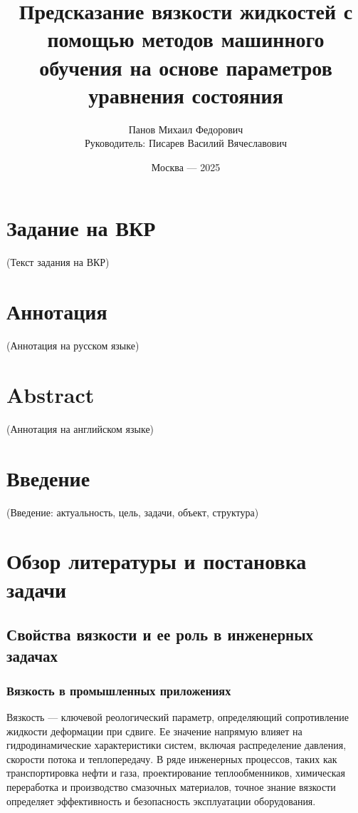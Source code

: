 \documentclass[a4paper,12pt]{article}
\title{\Huge{Предсказание вязкости жидкостей с помощью методов машинного обучения на основе параметров уравнения состояния}}
\author{Панов Михаил Федорович \\ Руководитель: Писарев Василий Вячеславович}
\date{Москва --- 2025}
\begin{document}
\maketitle
\thispagestyle{empty}
\newpage

\section*{Задание на ВКР}
(Текст задания на ВКР)

\section*{Аннотация}
(Аннотация на русском языке)

\section*{Abstract}
(Аннотация на английском языке)
\newpage

\tableofcontents
\newpage

\section*{Введение}
(Введение: актуальность, цель, задачи, объект, структура)

\section{Обзор литературы и постановка задачи}
  \subsection{Свойства вязкости и ее роль в инженерных задачах}

    \subsubsection{Вязкость в промышленных приложениях}

Вязкость — ключевой реологический параметр, определяющий сопротивление жидкости деформации при сдвиге. Ее значение напрямую влияет на гидродинамические характеристики систем, включая распределение давления, скорости потока и теплопередачу. В ряде инженерных процессов, таких как транспортировка нефти и газа, проектирование теплообменников, химическая переработка и производство смазочных материалов, точное знание вязкости определяет эффективность и безопасность эксплуатации оборудования. 
\end{document}
